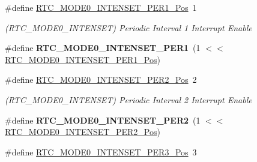 \begin{DoxyCompactItemize}
\item 
\hypertarget{group___s_a_m_l21___r_t_c_ga47bdb5a3e6ef5083bb5f4d0a72d41231}{}\#define \hyperlink{group___s_a_m_l21___r_t_c_ga47bdb5a3e6ef5083bb5f4d0a72d41231}{R\+T\+C\+\_\+\+M\+O\+D\+E0\+\_\+\+I\+N\+T\+E\+N\+S\+E\+T\+\_\+\+P\+E\+R1\+\_\+\+Pos}~1\label{group___s_a_m_l21___r_t_c_ga47bdb5a3e6ef5083bb5f4d0a72d41231}

\begin{DoxyCompactList}\small\item\em (R\+T\+C\+\_\+\+M\+O\+D\+E0\+\_\+\+I\+N\+T\+E\+N\+S\+E\+T) Periodic Interval 1 Interrupt Enable \end{DoxyCompactList}\item 
\hypertarget{group___s_a_m_l21___r_t_c_ga323ccf6172ca0bb95fbe548f00f8a833}{}\#define {\bfseries R\+T\+C\+\_\+\+M\+O\+D\+E0\+\_\+\+I\+N\+T\+E\+N\+S\+E\+T\+\_\+\+P\+E\+R1}~(1 $<$$<$ \hyperlink{group___s_a_m_l21___r_t_c_ga47bdb5a3e6ef5083bb5f4d0a72d41231}{R\+T\+C\+\_\+\+M\+O\+D\+E0\+\_\+\+I\+N\+T\+E\+N\+S\+E\+T\+\_\+\+P\+E\+R1\+\_\+\+Pos})\label{group___s_a_m_l21___r_t_c_ga323ccf6172ca0bb95fbe548f00f8a833}

\item 
\hypertarget{group___s_a_m_l21___r_t_c_ga6846d4004aa75e8de5d42a5dbb517f5a}{}\#define \hyperlink{group___s_a_m_l21___r_t_c_ga6846d4004aa75e8de5d42a5dbb517f5a}{R\+T\+C\+\_\+\+M\+O\+D\+E0\+\_\+\+I\+N\+T\+E\+N\+S\+E\+T\+\_\+\+P\+E\+R2\+\_\+\+Pos}~2\label{group___s_a_m_l21___r_t_c_ga6846d4004aa75e8de5d42a5dbb517f5a}

\begin{DoxyCompactList}\small\item\em (R\+T\+C\+\_\+\+M\+O\+D\+E0\+\_\+\+I\+N\+T\+E\+N\+S\+E\+T) Periodic Interval 2 Interrupt Enable \end{DoxyCompactList}\item 
\hypertarget{group___s_a_m_l21___r_t_c_ga09a7eb2f52171a1bda6c64bb88821ec9}{}\#define {\bfseries R\+T\+C\+\_\+\+M\+O\+D\+E0\+\_\+\+I\+N\+T\+E\+N\+S\+E\+T\+\_\+\+P\+E\+R2}~(1 $<$$<$ \hyperlink{group___s_a_m_l21___r_t_c_ga6846d4004aa75e8de5d42a5dbb517f5a}{R\+T\+C\+\_\+\+M\+O\+D\+E0\+\_\+\+I\+N\+T\+E\+N\+S\+E\+T\+\_\+\+P\+E\+R2\+\_\+\+Pos})\label{group___s_a_m_l21___r_t_c_ga09a7eb2f52171a1bda6c64bb88821ec9}

\item 
\hypertarget{group___s_a_m_l21___r_t_c_gae79a72435f76270c96e08dc85e15057e}{}\#define \hyperlink{group___s_a_m_l21___r_t_c_gae79a72435f76270c96e08dc85e15057e}{R\+T\+C\+\_\+\+M\+O\+D\+E0\+\_\+\+I\+N\+T\+E\+N\+S\+E\+T\+\_\+\+P\+E\+R3\+\_\+\+Pos}~3\label{group___s_a_m_l21___r_t_c_gae79a72435f76270c96e08dc85e15057e}


\end{DoxyCompactItemize}
